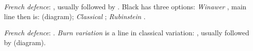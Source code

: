 \newline
\begin{minipage}[t]{.225\linewidth}
\raggedright
\begin{center}
\scalebox{.700}{\showboard}
\end{center}
\newgame
\emph{French defence}: , usually followed by .
Black has three options:
\emph{Winawer} , main line then is:  (diagram);
\emph{Classical} ;
\emph{Rubinstein} .\vspace{2mm}
\end{minipage}
\hspace{5mm}
\begin{minipage}[t]{.225\linewidth}
\raggedright
\begin{center}
\scalebox{.700}{\showboard}
\end{center}
\newgame
\emph{French defence}: .
\emph{Burn variation} is a line in classical variation: , usually followed by  (diagram).\vspace{2mm}
\end{minipage}
\hspace{5mm}

